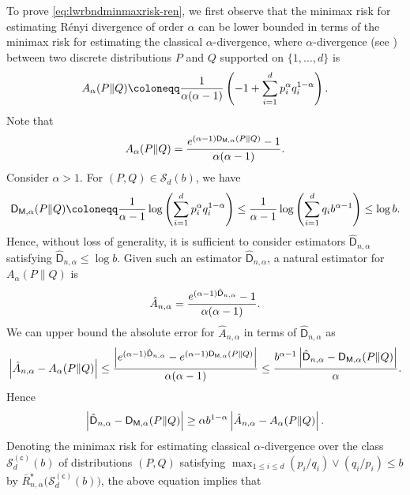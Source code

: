 \documentclass[a4paper,onecolumn,11pt,accepted=2026-05-12]{quantumarticle}
\newcommand{\abs}[1]{\left\vert#1\right\vert}
\newcommand{\sD}{\mathsf{D}}
\newcommand{\cS}{\mathcal{S}}
\begin{document}
\medskip
To prove  \eqref{eq:lwrbndminmaxrisk-ren}, we first observe that the minimax risk for estimating R\'{e}nyi divergence of order $\alpha$ can be lower bounded in terms of the minimax risk for estimating the classical $\alpha$-divergence, where $\alpha$-divergence (see \cite{Yanjun-2020-alphadiv}) between two discrete distributions $P$ and $Q$ supported on $\{1,\ldots,d\}$ is 
\begin{align}
A_{\alpha}(P\|Q)\coloneqq \frac{1}{\alpha (\alpha-1)} \left(-1+\sum_{i=1}^d p_i^{\alpha} q_i^{1-\alpha}\right). \notag
\end{align}
Note that 
\begin{align}
    A_{\alpha}(P\|Q)=\frac{e^{(\alpha-1)\sD_{\mathsf{M},\alpha}(P\Vert Q)}-1}{\alpha(\alpha-1)}. \notag 
\end{align}
Consider $\alpha >1$.  For $(P,Q) \in \cS_d(b)$, we have 
\begin{align}
   \sD_{\mathsf{M},\alpha}(P\Vert Q)\coloneqq \frac{1}{\alpha-1}\log \left(\sum_{i=1}^d p_i^{\alpha} q_i^{1-\alpha}\right) \leq \frac{1}{\alpha-1}\log \left(\sum_{i=1}^d q_i b^{\alpha-1}\right) \leq \log b.\notag
\end{align}
Hence, without loss of generality, it is sufficient to consider  estimators $\hat{\sD}_{n,\alpha}$  satisfying $\hat{\sD}_{n,\alpha} \leq \log b$. Given such an estimator $\hat{\sD}_{n,\alpha} $,  a natural estimator for $A_{\alpha}(P\|Q)$ is  
\begin{align}
    \hat{A}_{n,\alpha} =\frac{e^{(\alpha-1)\hat{\sD}_{n,\alpha}}-1}{\alpha(\alpha-1)}.\notag
\end{align}
We can upper bound the absolute error for $\hat{A}_{n,\alpha}$ in terms of $\hat{\sD}_{n,\alpha}$ as 
\begin{align}
    \abs{\hat{A}_{n,\alpha}-A_{\alpha}(P\|Q)}\leq \frac{\abs{e^{(\alpha-1)\hat{\sD}_{n,\alpha}}-e^{(\alpha-1)\sD_{\mathsf{M},\alpha}(P\Vert Q)}}}{\alpha(\alpha-1)}\leq \frac{b^{\alpha-1}\abs{\hat{\sD}_{n,\alpha}-\sD_{\mathsf{M},\alpha}(P\Vert Q)}}{\alpha}.\notag 
\end{align}
Hence
\begin{align}
   \abs{\hat{\sD}_{n,\alpha}-\sD_{\mathsf{M},\alpha}(P\Vert Q)} \geq \alpha b^{1-\alpha} \abs{\hat{A}_{n,\alpha}-A_{\alpha}(P\|Q)}.\notag 
\end{align}
Denoting  the minimax risk for estimating classical $\alpha$-divergence over the class $\cS_d^{(\mathsf{c})}(b)$ of distributions $(P,Q)$ satisfying $\max_{1 \leq i \leq d} (p_i/q_i)\vee (q_i/p_i) \leq b$ by $\bar R_{n,\alpha}^{\star}\big(\cS_d^{(\mathsf{c})}(b)\big)$, the above equation implies that
\end{document}
